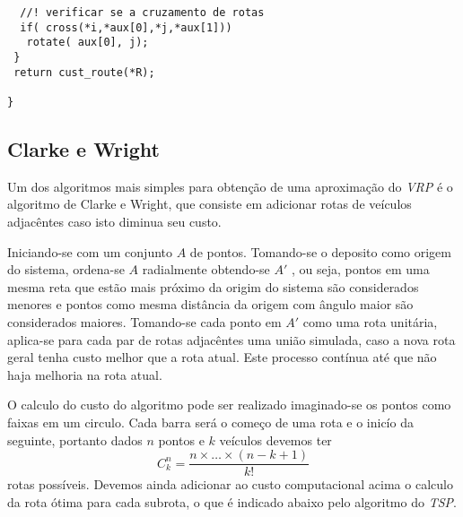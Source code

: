 \documentclass[a4paper, 12pt]{article}
\begin{document}
{\begin{verbatim}
  //! verificar se a cruzamento de rotas                                                                                                                        
  if( cross(*i,*aux[0],*j,*aux[1]))                                                                                                                             
   rotate( aux[0], j);                                                                                                                                          
 }                                                                                                                                                              
 return cust_route(*R);                                                                                                                                         
                                                                                                                                                                
} 
\end{verbatim}
}

\subsection{Clarke e Wright}

	Um dos algoritmos mais simples para obtenção de uma aproximação do
\emph{VRP} é o algoritmo de Clarke e Wright, que consiste em adicionar rotas de
veículos adjacêntes caso isto diminua seu custo.


	Iniciando-se com um conjunto $A$ de pontos. Tomando-se o deposito como
origem do sistema, ordena-se $A$ radialmente obtendo-se $A'$ , ou seja, pontos
em uma mesma reta que estão mais próximo da origim do sistema são considerados
menores e pontos como mesma distância da origem com ângulo maior são
considerados maiores.  Tomando-se cada ponto em $A'$ como uma rota unitária,
aplica-se para cada par de rotas adjacêntes uma união simulada, caso a nova rota
geral tenha custo melhor que a rota atual. Este processo contínua até que não
haja melhoria na rota atual.

	O calculo do custo do algoritmo pode ser realizado imaginado-se os pontos
como faixas em um circulo. Cada barra será o começo de uma rota e o inicío da
seguinte, portanto dados $n$ pontos e $k$ veículos devemos ter
	\[C_k^n = \frac{n\times\ldots\times(n-k+1)}{k!}\] 
	rotas possíveis. Devemos ainda adicionar ao custo computacional acima o
calculo da rota ótima para cada subrota, o que é indicado abaixo pelo algoritmo
do \emph{TSP}.
\end{document}
